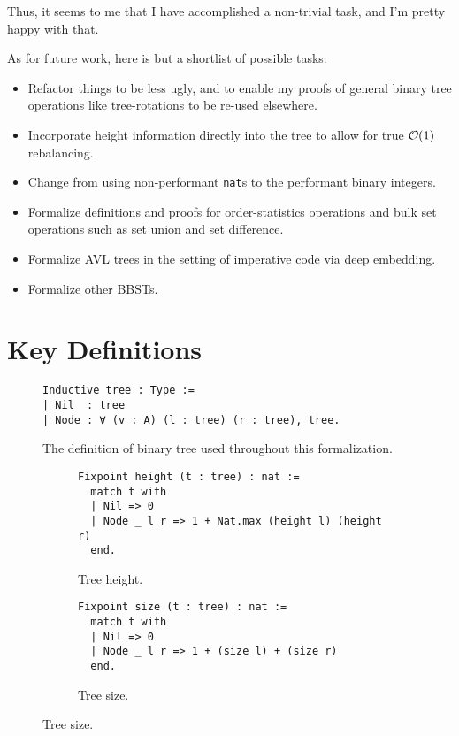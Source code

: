 \documentclass[acmsmall, authorversion, nonacm, overload]{acmart}
\DeclareRobustCommand{\bigO}{%
  \text{\usefont{OMS}{cmsy}{m}{n}O}%
}
\begin{document}
Thus, it seems to me that I have accomplished a non-trivial task, and I'm pretty happy with that.

As for future work, here is but a shortlist of possible tasks:
\begin{itemize}
\item Refactor things to be less ugly, and to enable my proofs of
  general binary tree operations like tree-rotations to be re-used elsewhere.
\item Incorporate height information directly into the tree
  to allow for true $\bigO(1)$ rebalancing.
\item Change from using non-performant \verb|nat|s to
  the performant binary integers.
\item Formalize definitions and proofs for order-statistics operations and
  bulk set operations such as set union and set difference.
\item Formalize AVL trees in the setting of imperative code
  via deep embedding.
\item Formalize other BBSTs.
\end{itemize}

\appendix

\section{Key Definitions}
\phantom{AAAA}

\begin{figure}[h!]
\begin{verbatim}
Inductive tree : Type :=
| Nil  : tree
| Node : ∀ (v : A) (l : tree) (r : tree), tree.
\end{verbatim}
\caption*{The definition of binary tree used throughout this formalization.}
\end{figure}

\begin{figure}[h!]
  \begin{subfigure}{0.5\textwidth}
    \centering
\begin{verbatim}
Fixpoint height (t : tree) : nat :=
  match t with
  | Nil => 0
  | Node _ l r => 1 + Nat.max (height l) (height r)
  end.
\end{verbatim}
  \caption*{Tree height.}
  \end{subfigure}%
  \begin{subfigure}{0.5\textwidth}
  \begin{verbatim}
Fixpoint size (t : tree) : nat :=
  match t with
  | Nil => 0
  | Node _ l r => 1 + (size l) + (size r)
  end.
\end{verbatim}
  \caption*{Tree size.}
  \end{subfigure}
\end{figure}
\end{document}
